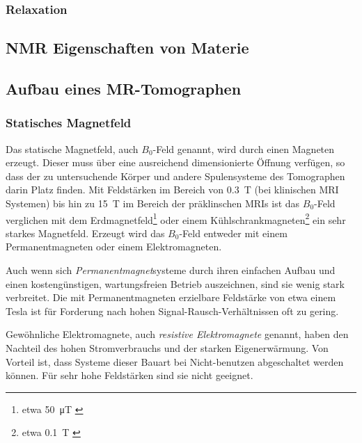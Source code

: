 

\subsubsection{Relaxation}

\subsection{NMR Eigenschaften von Materie}






\subsection{Aufbau eines MR-Tomographen}

\subsubsection{Statisches Magnetfeld}
Das statische Magnetfeld, auch $B_0$-Feld genannt, wird durch einen Magneten erzeugt. Dieser muss über eine ausreichend dimensionierte Öffnung verfügen, so dass der zu untersuchende Körper und andere Spulensysteme des Tomographen darin Platz finden. Mit Feldstärken im Bereich von \SI{0.3}{\tesla} (bei klinischen MRI Systemen) bis hin zu \SI{15}{\tesla} im Bereich der präklinschen MRIs ist das $B_0$-Feld verglichen mit dem Erdmagnetfeld\footnote{etwa \SI{50}{\micro\tesla} \cite{Enc1994}} oder einem Kühlschrankmagneten\footnote{etwa \SI{0.1}{\tesla} \cite{LHC2018}} ein sehr starkes Magnetfeld.
Erzeugt wird das $B_0$-Feld entweder mit einem Permanentmagneten oder einem Elektromagneten. 

Auch wenn sich \textit{Permanentmagnet}systeme durch ihren einfachen Aufbau und einen kostengünstigen, wartungsfreien Betrieb auszeichnen, sind sie wenig stark verbreitet. Die mit Permanentmagneten erzielbare Feldstärke von etwa einem Tesla ist für Forderung nach hohen Signal-Rausch-Verhältnissen oft zu gering.

Gewöhnliche Elektromagnete, auch \textit{resistive Elektromagnete} genannt, haben den Nachteil des hohen Stromverbrauchs und der starken Eigenerwärmung. Von Vorteil ist, dass Systeme dieser Bauart bei Nicht-benutzen abgeschaltet werden können. Für sehr hohe Feldstärken sind sie nicht geeignet.

